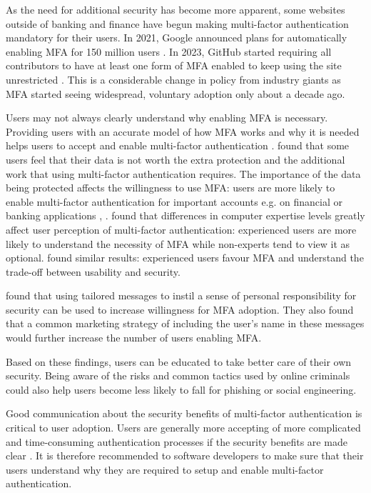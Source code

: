 As the need for additional security has become more apparent, some websites outside of banking and finance have begun making multi-factor authentication mandatory for their users. In 2021, Google announced plans for automatically enabling MFA for 150 million users \citep{google_making_2021}. In 2023, GitHub started requiring all contributors to have at least one form of MFA enabled to keep using the site unrestricted \citep{github_about_2024}. This is a considerable change in policy from industry giants as MFA started seeing widespread, voluntary adoption only about a decade ago.

Users may not always clearly understand why enabling MFA is necessary. Providing users with an accurate model of how MFA works and why it is needed helps users to accept and enable multi-factor authentication \citep[109-110]{golla_driving_2021}. \textcite{reese_usability_2019} found that some users feel that their data is not worth the extra protection and the additional work that using multi-factor authentication requires. The importance of the data being protected affects the willingness to use MFA: users are more likely to enable multi-factor authentication for important accounts e.g. on financial or banking applications \citep[365]{reese_usability_2019}, \citep[2]{marky_nah_2022}
. \textcite[5447]{das_mfa_2020} found that differences in computer expertise levels greatly affect user perception of multi-factor authentication: experienced users are more likely to understand the necessity of MFA while non-experts tend to view it as optional. \textcite[12]{marky_nah_2022} found similar results: experienced users favour MFA and understand the trade-off between usability and security.

\textcite[109-110]{golla_driving_2021} found that using tailored messages to instil a sense of personal responsibility for security can be used to increase willingness for MFA adoption. They also found that a common marketing strategy of including the user's name in these messages would further increase the number of users enabling MFA.

Based on these findings, users can be educated to take better care of their own security. Being aware of the risks and common tactics used by online criminals could also help users become less likely to fall for phishing or social engineering.

Good communication about the security benefits of multi-factor authentication is critical to user adoption. Users are generally more accepting of more complicated and time-consuming authentication processes if the security benefits are made clear \citep{marky_nah_2022}. It is therefore recommended to software developers to make sure that their users understand why they are required to setup and enable multi-factor authentication.

